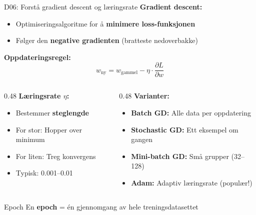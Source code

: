 \documentclass[aspectratio=169, 10pt]{beamer}
\begin{document}
\begin{frame}{D06: Forstå gradient descent og læringsrate}
    \textbf{Gradient descent:}
    \begin{itemize}
        \item Optimiseringsalgoritme for å \textbf{minimere loss-funksjonen}
        \item Følger den \textbf{negative gradienten} (bratteste nedoverbakke)
    \end{itemize}
    
    \vspace{0.3cm}
    \textbf{Oppdateringsregel:}
    \[
    w_{\text{ny}} = w_{\text{gammel}} - \eta \cdot \frac{\partial L}{\partial w}
    \]
    
    \begin{columns}[T]
        \begin{column}{0.48\textwidth}
            \textbf{Læringsrate $\eta$:}
            \begin{itemize}
                \item Bestemmer \textbf{steglengde}
                \item For stor: Hopper over minimum
                \item For liten: Treg konvergens
                \item Typisk: 0.001--0.01
            \end{itemize}
        \end{column}
        \begin{column}{0.48\textwidth}
            \textbf{Varianter:}
            \begin{itemize}
                \item \textbf{Batch GD:} Alle data per oppdatering
                \item \textbf{Stochastic GD:} Ett eksempel om gangen
                \item \textbf{Mini-batch GD:} Små grupper (32--128)
                \item \textbf{Adam:} Adaptiv læringsrate (populær!)
            \end{itemize}
        \end{column}
    \end{columns}
    
    \vspace{0.2cm}
    \begin{block}{\footnotesize Epoch}
        \footnotesize En \textbf{epoch} = én gjennomgang av hele treningsdatasettet
    \end{block}
\end{frame}
\end{document}
